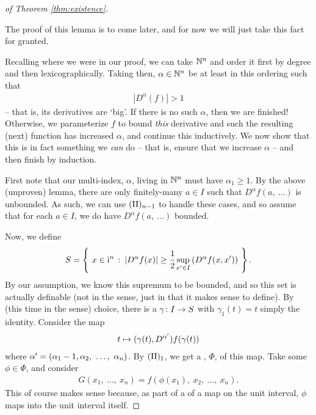 \begin{proof}[of Theorem \ref{thm:existence}]
\begin{lemma}
      \label{lem:fin_a_unbounded}
    \end{lemma}

    The proof of this lemma is to come later, and for now we will just take this fact for granted.

    Recalling where we were in our proof, we can take $\N^n$ and order it first by degree and then lexicographically. Taking then, $\alpha \in \N^n$ be at least in this ordering such that
      \begin{align*}
        \left\vert D^{\alpha}(f) \right\vert > 1
      \end{align*}
    -- that is, its derivatives are `big'. If there is no such $\alpha$, then we are finished! Otherwise, we parameterize $f$ to bound \emph{this} derivative and such the resulting (next) function has increased $\alpha$, and continue this inductively. We now show that this is in fact something we \emph{can} do -- that is, ensure that we increase $\alpha$ -- and then finish by induction.

    First note that our multi-index, $\alpha$, living in $\N^n$ must have $\alpha_1 \geq 1$. By the above (unproven) lemma, there are only finitely-many $a \in I$ such that $D^{\alpha} f(a, \ \hdots)$ is unbounded. As such, we can use $\IIn[n-1]$ to handle these cases, and so assume that for each $a \in I$, we do have $D^{\alpha} f(a, \ \hdots)$ bounded.

    Now, we define
      \begin{align*}
        S = \left\{ \ x \in \I^n \ \colon \left\vert D^{\alpha} f(x) \right\vert \geq \cfrac{1}{2} \sup_{\pri{x} \in I} \left( D^{\alpha} f(x, \pri{x}) \right) \ \right\}.
      \end{align*}
    By our assumption, we know this supremum to be bounded, and so this set is actually definable (not in the \om sense, just in that it makes sense to define). By  (this time in the \om sense) choice, there is a  $\funcdom{\gamma}{I}{S}$ with $\gamma_1(t) = t$ simply the identity. Consider the map
      \begin{align*}
        t \mapsto (\gamma(t), D^{\pri{\alpha}}) f (\gamma(t))
      \end{align*}
    where $\pri{\alpha} = (\alpha_1 - 1, \alpha_2, \ \hdots, \ \alpha_n)$. By $\IIn[1]$, we get a \cellrparam, $\Phi$, of this map. Take some $\phi \in \Phi$, and consider
      \begin{align*}
        G(x_1, \ \hdots, \ x_n) = f(\phi(x_1), \ x_2, \ \hdots, \ x_n ).
      \end{align*}
    This of course makes sense because, as part of a \cellrparam of a map on the unit interval, $\phi$ maps into the unit interval itself.


\end{proof}
